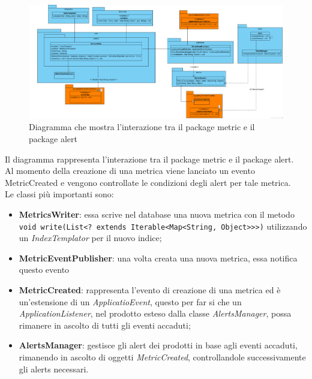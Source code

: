         \begin{figure}[htbp]
            \centering
            \includegraphics[width=\textwidth]{./img/DiagrammiClasse/metricToAlert.png}
            \caption[Diagramma Metric - Alert]{Diagramma che mostra l'interazione tra il package metric e il package alert}
        \end{figure}
        Il diagramma rappresenta l'interazione tra il package metric e il package alert. \\
	Al momento della creazione di una metrica viene lanciato un evento MetricCreated e vengono controllate le condizioni degli alert per tale metrica. \\
        Le classi più importanti sono:
        \begin{itemize}
        	\item \textbf{MetricsWriter}: essa scrive nel database una nuova metrica con il metodo \\
        		\verb=void write(List<? extends Iterable<Map<String, Object>>>)= utilizzando un \textit{IndexTemplator} 
        		per il nuovo indice;
        	\item \textbf{MetricEventPublisher}: una volta creata una nuova metrica, essa notifica questo evento
        	\item \textbf{MetricCreated}: rappresenta l'evento di creazione di una metrica ed è un'estensione
        		di un \textit{ApplicatioEvent}, questo per far si che un \textit{ApplicationListener}, nel prodotto esteso
        		dalla classe \textit{AlertsManager}, possa rimanere in ascolto di tutti gli eventi accaduti;
        	\item \textbf{AlertsManager}: gestisce gli alert dei prodotti in base agli eventi accaduti, rimanendo in ascolto di oggetti \textit{MetricCreated}, controllandole successivamente gli alerts necessari.
        \end{itemize}

\newpage


